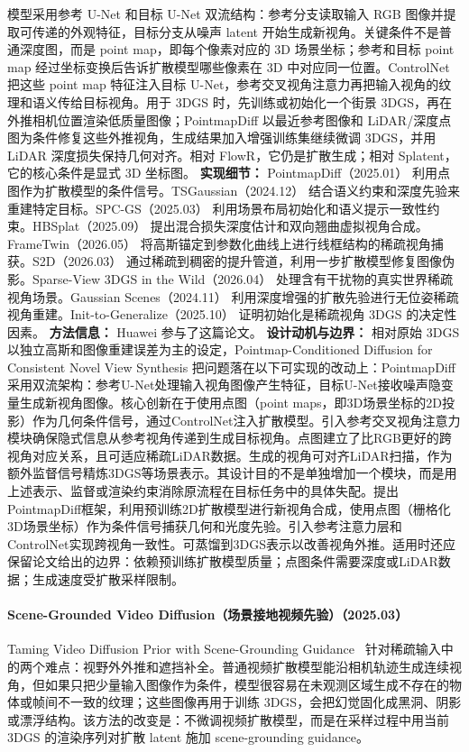 模型采用参考 U-Net 和目标 U-Net 双流结构：参考分支读取输入 RGB 图像并提取可传递的外观特征，目标分支从噪声 latent 开始生成新视角。关键条件不是普通深度图，而是 point map，即每个像素对应的 3D 场景坐标；参考和目标 point map 经过坐标变换后告诉扩散模型哪些像素在 3D 中对应同一位置。ControlNet 把这些 point map 特征注入目标 U-Net，参考交叉视角注意力再把输入视角的纹理和语义传给目标视角。用于 3DGS 时，先训练或初始化一个街景 3DGS，再在外推相机位置渲染低质量图像；PointmapDiff 以最近参考图像和 LiDAR/深度点图为条件修复这些外推视角，生成结果加入增强训练集继续微调 3DGS，并用 LiDAR 深度损失保持几何对齐。相对 FlowR，它仍是扩散生成；相对 Splatent，它的核心条件是显式 3D 坐标图。
\textbf{实现细节：} PointmapDiff（2025.01） 利用点图作为扩散模型的条件信号。TSGaussian（2024.12） 结合语义约束和深度先验来重建特定目标。SPC-GS（2025.03） 利用场景布局初始化和语义提示一致性约束。HBSplat（2025.09） 提出混合损失深度估计和双向翘曲虚拟视角合成。FrameTwin（2026.05） 将高斯锚定到参数化曲线上进行线框结构的稀疏视角捕获。S2D（2026.03） 通过稀疏到稠密的提升管道，利用一步扩散模型修复图像伪影。Sparse-View 3DGS in the Wild（2026.04） 处理含有干扰物的真实世界稀疏视角场景。Gaussian Scenes（2024.11） 利用深度增强的扩散先验进行无位姿稀疏视角重建。Init-to-Generalize（2025.10） 证明初始化是稀疏视角 3DGS 的决定性因素。
\textbf{方法信息：} Huawei 参与了这篇论文。
\textbf{设计动机与边界：} 相对原始 3DGS 以独立高斯和图像重建误差为主的设定，Pointmap-Conditioned Diffusion for Consistent Novel View Synthesis 把问题落在以下可实现的改动上：PointmapDiff采用双流架构：参考U-Net处理输入视角图像产生特征，目标U-Net接收噪声隐变量生成新视角图像。核心创新在于使用点图（point maps，即3D场景坐标的2D投影）作为几何条件信号，通过ControlNet注入扩散模型。引入参考交叉视角注意力模块确保隐式信息从参考视角传递到生成目标视角。点图建立了比RGB更好的跨视角对应关系，且可适应稀疏LiDAR数据。生成的视角可对齐LiDAR扫描，作为额外监督信号精炼3DGS等场景表示。其设计目的不是单独增加一个模块，而是用上述表示、监督或渲染约束消除原流程在目标任务中的具体失配。提出PointmapDiff框架，利用预训练2D扩散模型进行新视角合成，使用点图（栅格化3D场景坐标）作为条件信号捕获几何和光度先验。引入参考注意力层和ControlNet实现跨视角一致性。可蒸馏到3DGS表示以改善视角外推。适用时还应保留论文给出的边界：依赖预训练扩散模型质量；点图条件需要深度或LiDAR数据；生成速度受扩散采样限制。
\paragraph{Scene-Grounded Video Diffusion（场景接地视频先验）（2025.03）}
Taming Video Diffusion Prior with Scene-Grounding Guidance~\cite{2503_05082} 针对稀疏输入中的两个难点：视野外外推和遮挡补全。普通视频扩散模型能沿相机轨迹生成连续视角，但如果只把少量输入图像作为条件，模型很容易在未观测区域生成不存在的物体或帧间不一致的纹理；这些图像再用于训练 3DGS，会把幻觉固化成黑洞、阴影或漂浮结构。该方法的改变是：不微调视频扩散模型，而是在采样过程中用当前 3DGS 的渲染序列对扩散 latent 施加 scene-grounding guidance。

